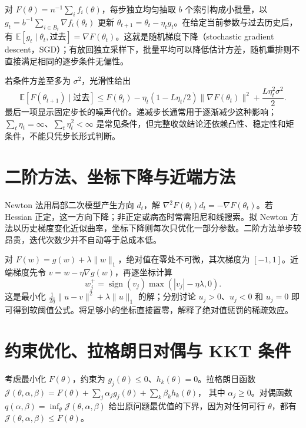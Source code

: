 \documentclass[UTF8,12pt,a4paper,fontset=fandol]{ctexbook}
\begin{document}
对 $F(\theta)=n^{-1}\sum_i f_i(\theta)$，每步独立均匀抽取 $b$ 个索引构成小批量，以 $g_t=b^{-1}\sum_{i\in B_t}\nabla f_i(\theta_t)$ 更新 $\theta_{t+1}=\theta_t-\eta_tg_t$。在给定当前参数与过去历史后，有 $\mathbb E[g_t\mid\theta_t,\text{过去}]=\nabla F(\theta_t)$。这就是随机梯度下降（stochastic gradient descent，SGD）；有放回独立采样下，批量平均可以降低估计方差，随机重排则不直接满足相同的逐步条件无偏性。

若条件方差至多为 $\sigma^2$，光滑性给出
\[
 \mathbb E[F(\theta_{t+1})\mid\text{过去}]
 \leq F(\theta_t)-\eta_t(1-L\eta_t/2)\|\nabla F(\theta_t)\|^2
 +\frac{L\eta_t^2\sigma^2}{2}.
\]
最后一项显示固定步长的噪声代价。递减步长通常用于逐渐减少这种影响；$\sum_t\eta_t=\infty$、$\sum_t\eta_t^2<\infty$ 是常见条件，但完整收敛结论还依赖凸性、稳定性和矩条件，不能只凭步长形式判断。

\section{二阶方法、坐标下降与近端方法}

Newton 法用局部二次模型产生方向 $d_t$，解 $\nabla^2F(\theta_t)d_t=-\nabla F(\theta_t)$。若 Hessian 正定，这一方向下降；非正定或病态时常需阻尼和线搜索。拟 Newton 方法以历史梯度变化近似曲率，坐标下降则每次只优化一部分参数。二阶方法单步较昂贵，迭代次数少并不自动等于总成本低。

对 $F(w)=g(w)+\lambda\|w\|_1$，绝对值在零处不可微，其次梯度为 $[-1,1]$。近端梯度先令 $v=w-\eta\nabla g(w)$，再逐坐标计算
\begin{equation}
 w_j^{+}=\operatorname{sign}(v_j)\max(|v_j|-\eta\lambda,0).
 \label{eq:ml-soft-threshold}
\end{equation}
这是最小化 $\frac1{2\eta}\|u-v\|^2+\lambda\|u\|_1$ 的解；分别讨论 $u_j>0$、$u_j<0$ 和 $u_j=0$ 即可得到软阈值公式。将足够小的坐标直接置零，解释了绝对值惩罚的稀疏效应。

\section{约束优化、拉格朗日对偶与 KKT 条件}

考虑最小化 $F(\theta)$，约束为 $g_j(\theta)\leq0$、$h_k(\theta)=0$。拉格朗日函数
$\mathcal J(\theta,\alpha,\beta)=F(\theta)+\sum_j\alpha_jg_j(\theta)+\sum_k\beta_kh_k(\theta)$，
其中 $\alpha_j\geq0$。对偶函数 $q(\alpha,\beta)=\inf_\theta\mathcal J(\theta,\alpha,\beta)$ 给出原问题最优值的下界，因为对任何可行 $\theta$，都有 $\mathcal J(\theta,\alpha,\beta)\leq F(\theta)$。
\end{document}

